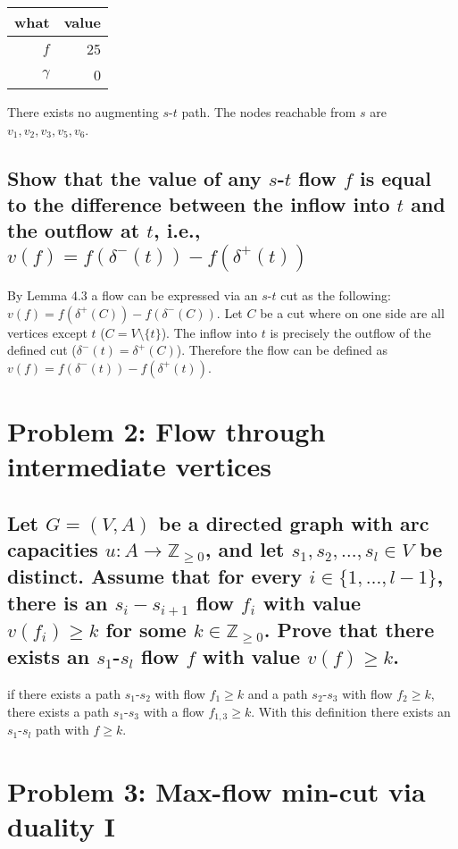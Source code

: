 \documentclass[12pt, a4]{article}
\begin{document}
\begin{minipage}{.2\textwidth}
	\begin{tabular}{rr}
		\toprule
		what & value \\ \midrule
		$f$ & 25 \\
		{\color{red}$\gamma$} & 0 \\
		\bottomrule
	\end{tabular}
\end{minipage}
There exists no augmenting $s$-$t$ path. The nodes reachable from $s$ are $v_1,v_2,v_3,v_5,v_6$.
\subsection{Show that the value of any $s$-$t$ flow $f$ is equal to the difference between the inflow into $t$ and the outflow at $t$, i.e.,$v(f) =f(\delta^-(t))-f(\delta^+(t))$}
By Lemma 4.3 a flow can be expressed via an $s$-$t$ cut as the following: $v(f)=f(\delta^+(C)) - f(\delta^-(C))$. Let $C$ be a cut where on one side are all vertices except $t$ ($C = V \setminus \{t\}$). The inflow into $t$ is precisely the outflow of the defined cut ($\delta^-(t) = \delta^+(C)$). Therefore the flow can be defined as $v(f) =f(\delta^-(t))-f(\delta^+(t))$.

\section{Problem 2: Flow through intermediate vertices}
\subsection{
Let $G= (V,A)$ be a directed graph with arc capacities $u:A\rightarrow\mathbb{Z}_{\geq0}$, and let $s_1,s_2,\ldots,s_l \in V$ be distinct. Assume that for every $i \in \{1,\ldots,l-1\}$, there is an $s_i-s_{i+1}$ flow $f_i$ with value $v(f_i)\geq k$ for some $k\in \mathbb{Z}_{\geq 0}$. Prove that there exists an $s_1$-$s_l$ flow $f$ with value $v(f)\geq k$.
}

if there exists a path $s_1$-$s_2$ with flow $f_1 \geq k$ and a path $s_2$-$s_3$ with flow $f_2\geq k$, there exists a path $s_1$-$s_3$ with a flow $f_{1,3} \geq k$. 
With this definition there exists an $s_1$-$s_l$ path with $f \geq k$.

\section{Problem 3: Max-flow min-cut via duality I}
\end{document}
